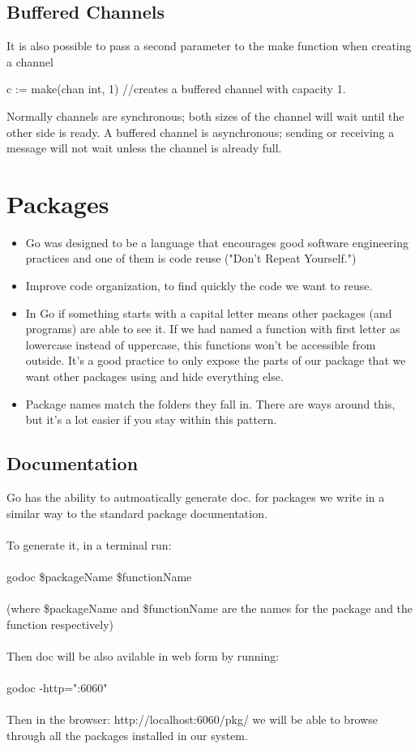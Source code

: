 \documentclass[twoside,a4paper,english]{report}
\begin{document}
\section{Buffered Channels}
It is also possible to pass a second parameter to the make function when creating a channel
\begin{go}
c := make(chan int, 1)  //creates a buffered channel with capacity 1. 
\end{go}
Normally channels are synchronous; both sizes of the channel will wait until the other side is ready. A buffered channel is asynchronous; sending or receiving a message will not wait unless the channel is already full.
\chapter{Packages}
\begin{itemize}
\item Go was designed to be a language that encourages good software engineering practices and one of them is code reuse ("Don't Repeat Yourself.")
\item Improve code organization, to find quickly the code we want to reuse.
\item In Go if something starts with a capital letter means other packages (and programs) are able to see it. If we had named a function with first letter as lowercase instead of uppercase, this functions won't be accessible from outside. It's a good practice to only expose the parts of our package that we want other packages using and hide everything else.
\item Package names match the folders they fall in. There are ways around this, but it's a lot easier if you stay within this pattern.
\end{itemize}
\section{Documentation}
Go has the ability to autmoatically generate doc. for packages we write in a similar way to the standard package documentation.\\\\
To generate it, in a terminal run:\\\\
godoc \$packageName \$functionName\\\\
(where \$packageName and \$functionName are the names for the package and the function respectively)\\\\
Then doc will be also avilable in web form by running:\\\\
godoc -http=":6060"\\\\
Then in the browser: http://localhost:6060/pkg/   we will be able to browse through all the packages installed in our system.
\end{document}
